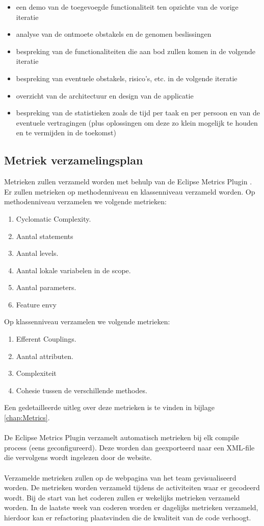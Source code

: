 \begin{itemize}
\item een demo van de toegevoegde functionaliteit ten opzichte van de vorige iteratie
\item analyse van de ontmoete obstakels en de genomen beslissingen
\item bespreking van de functionaliteiten die aan bod zullen komen in de volgende iteratie
\item bespreking van eventuele obstakels, risico’s, etc. in de volgende iteratie
\item overzicht van de architectuur en design van de applicatie
\item bespreking van de statistieken zoals de tijd per taak en per persoon en van de eventuele vertragingen (plus oplossingen om deze zo klein mogelijk te houden en te vermijden in de toekomst)
\end{itemize}

\subsection{Metriek verzamelingsplan} \label{sec:Metrics}
Metrieken zullen verzameld worden met behulp van de Eclipse Metrics Plugin \cite{EclipseMetricsPlugin}. Er zullen metrieken op methodenniveau en klassenniveau verzameld worden. Op methodenniveau verzamelen we volgende metrieken:
\begin{enumerate}
	\item Cyclomatic Complexity.
	\item Aantal statements
	\item Aantal levels.
	\item Aantal lokale variabelen in de scope.
	\item Aantal parameters.
	\item Feature envy
\end{enumerate}
Op klassenniveau verzamelen we volgende metrieken:
\begin{enumerate}
	\item Efferent Couplings.
	\item Aantal attributen.
	\item Complexiteit
	\item Cohesie tussen de verschillende methodes.
\end{enumerate}
Een gedetailleerde uitleg over deze metrieken is te vinden in bijlage \ref{chap:Metrics}.
\\
\\
De Eclipse Metrics Plugin verzamelt automatisch metrieken bij elk compile process (eens geconfigureerd). Deze worden dan geexporteerd naar een XML-file die vervolgens wordt ingelezen door de website.
\\
\\
Verzamelde metrieken zullen op de webpagina van het team gevisualiseerd worden. De metrieken worden verzameld tijdens de activiteiten waar er gecodeerd wordt. Bij de start van het coderen zullen er wekelijks metrieken verzameld worden. In de laatste week van coderen worden er dagelijks metrieken verzameld, hierdoor kan er refactoring plaatsvinden die de kwaliteit van de code verhoogt.

